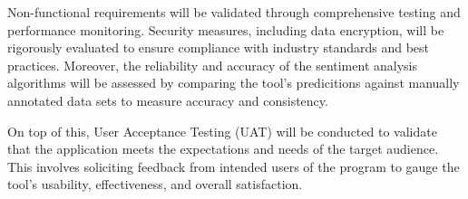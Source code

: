 Non-functional requirements will be validated through comprehensive testing and performance monitoring. Security measures, including data encryption, will be rigorously evaluated to ensure compliance with industry standards and best practices. Moreover, the reliability and accuracy of the sentiment analysis algorithms will be assessed by comparing the tool's predicitions against manually annotated data sets to measure accuracy and consistency.

On top of this, User Acceptance Testing (UAT) will be conducted to validate that the application meets the expectations and needs of the target audience. This involves soliciting feedback from intended users of the program to gauge the tool's usability, effectiveness, and overall satisfaction.